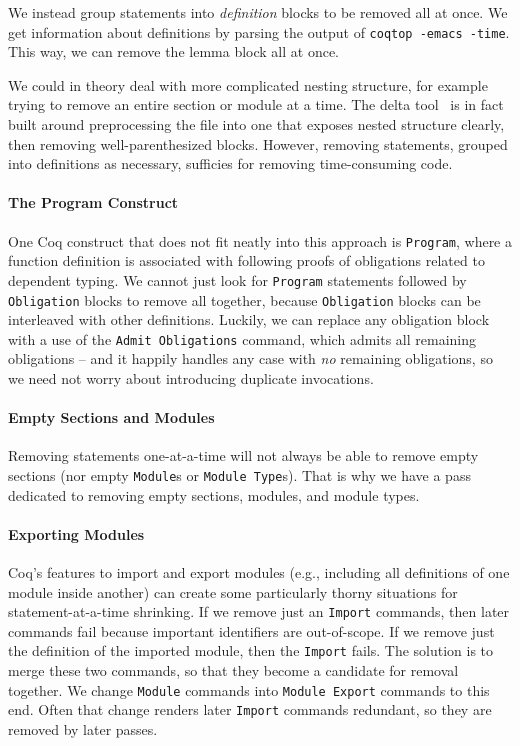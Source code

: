 \documentclass[a4paper,USenglish,cleveref,autoref,thm-restate]{lipics-v2021}
\begin{document}
We instead group statements into \emph{definition} blocks to be removed all at once.
We get information about definitions by parsing the output of \texttt{coqtop -emacs -time}.
This way, we can remove the lemma block all at once.

We could in theory deal with more complicated nesting structure, for example trying to remove an entire section or module at a time.
The delta tool~\cite{delta} is in fact built around preprocessing the file into one that exposes nested structure clearly, then removing well-parenthesized blocks.
However, removing statements, grouped into definitions as necessary, sufficies for removing time-consuming code.

\paragraph{The Program Construct}
One Coq construct that does not fit neatly into this approach is \verb|Program|, where a function definition is associated with following proofs of obligations related to dependent typing.
We cannot just look for \verb|Program| statements followed by \verb|Obligation| blocks to remove all together, because \verb|Obligation| blocks can be interleaved with other definitions.
Luckily, we can replace any obligation block with a use of the \verb|Admit Obligations| command, which admits all remaining obligations -- and it happily handles any case with \emph{no} remaining obligations, so we need not worry about introducing duplicate invocations.

\paragraph{Empty Sections and Modules}
Removing statements one-at-a-time will not always be able to remove empty sections (nor empty \verb|Module|s or \verb|Module Type|s).
That is why we have a pass dedicated to removing empty sections, modules, and module types.

\paragraph{Exporting Modules}
Coq's features to import and export modules (e.g., including all definitions of one module inside another) can create some particularly thorny situations for statement-at-a-time shrinking.
If we remove just an \verb|Import| commands, then later commands fail because important identifiers are out-of-scope.
If we remove just the definition of the imported module, then the \verb|Import| fails.
The solution is to merge these two commands, so that they become a candidate for removal together.
We change \verb|Module| commands into \verb|Module Export| commands to this end.
Often that change renders later \verb|Import| commands redundant, so they are removed by later passes.
\end{document}
